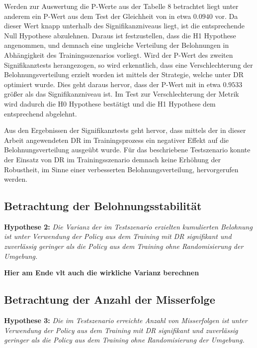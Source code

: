 Werden zur Auswertung die P-Werte aus der Tabelle 8 betrachtet liegt unter anderem ein P-Wert aus dem Test der Gleichheit von in etwa $0.0940$ vor.
Da dieser Wert knapp unterhalb des Signifikanzniveaus liegt, ist die entsprechende Null Hypothese abzulehnen.
Daraus ist festzustellen, dass die H1 Hypothese angenommen, und demnach eine ungleiche Verteilung der Belohnungen in Abhängigkeit des Trainingsszenarios vorliegt.
Wird der P-Wert des zweiten Signifikanztests herangezogen, so wird erkenntlich, dass eine Verschlechterung der Belohnungsverteilung erzielt worden ist mittels der Strategie, welche unter DR optimiert wurde.
Dies geht daraus hervor, dass der P-Wert mit in etwa $0.9533$ größer als das Signifikanzniveau ist.
Im Test zur Verschlechterung der Metrik wird dadurch die H0 Hypothese bestätigt und die H1 Hypothese dem entsprechend abgelehnt.

Aus den Ergebnissen der Signifikanztests geht hervor, dass mittels der in dieser Arbeit angewendeten DR im Trainingsprozess ein negativer Effekt auf die Belohnungsverteilung ausgeübt wurde.
Für das beschriebene Testszenario konnte der Einsatz von DR im Trainingsszenario demnach keine Erhöhung der Robustheit, im Sinne einer verbesserten Belohnungsverteilung, hervorgerufen werden.

\subsection{Betrachtung der Belohnungsstabilität}

\textbf{Hypothese 2:}
\textit{Die Varianz der im Testszenario erzielten kumulierten Belohnung ist unter Verwendung der Policy aus dem Training mit DR signifikant und zuverlässig geringer als die Policy aus dem Training ohne Randomisierung der Umgebung.}

\textbf{Hier am Ende vlt auch die wirkliche Varianz berechnen}

\subsection{Betrachtung der Anzahl der Misserfolge}

\textbf{Hypothese 3:}
\textit{Die im Testszenario erreichte Anzahl von Misserfolgen ist unter Verwendung der Policy aus dem Training mit DR signifikant und zuverlässig geringer als die Policy aus dem Training ohne Randomisierung der Umgebung.}

